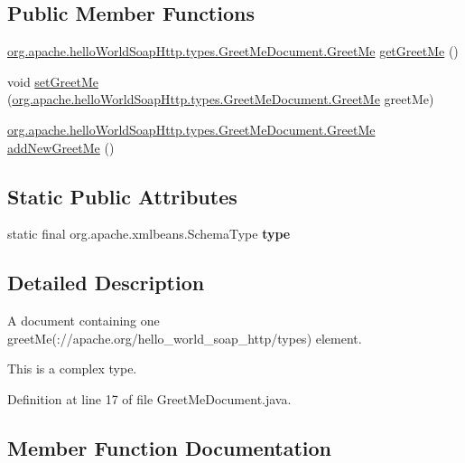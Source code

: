 \subsection*{Public Member Functions}
\begin{DoxyCompactItemize}
\item 
\hyperlink{interfaceorg_1_1apache_1_1hello_world_soap_http_1_1types_1_1_greet_me_document_1_1_greet_me}{org.\+apache.\+hello\+World\+Soap\+Http.\+types.\+Greet\+Me\+Document.\+Greet\+Me} \hyperlink{interfaceorg_1_1apache_1_1hello_world_soap_http_1_1types_1_1_greet_me_document_a13dabe72f28b15c8ddad003df9dd1369}{get\+Greet\+Me} ()
\item 
void \hyperlink{interfaceorg_1_1apache_1_1hello_world_soap_http_1_1types_1_1_greet_me_document_a3d4f4a336f799d082c23ddca3fa95a13}{set\+Greet\+Me} (\hyperlink{interfaceorg_1_1apache_1_1hello_world_soap_http_1_1types_1_1_greet_me_document_1_1_greet_me}{org.\+apache.\+hello\+World\+Soap\+Http.\+types.\+Greet\+Me\+Document.\+Greet\+Me} greet\+Me)
\item 
\hyperlink{interfaceorg_1_1apache_1_1hello_world_soap_http_1_1types_1_1_greet_me_document_1_1_greet_me}{org.\+apache.\+hello\+World\+Soap\+Http.\+types.\+Greet\+Me\+Document.\+Greet\+Me} \hyperlink{interfaceorg_1_1apache_1_1hello_world_soap_http_1_1types_1_1_greet_me_document_a3961b7576b6c83b90921ea47d9d71e4c}{add\+New\+Greet\+Me} ()
\end{DoxyCompactItemize}
\subsection*{Static Public Attributes}
\begin{DoxyCompactItemize}
\item 
static final org.\+apache.\+xmlbeans.\+Schema\+Type {\bfseries type}
\end{DoxyCompactItemize}


\subsection{Detailed Description}
A document containing one greet\+Me(\+://apache.org/hello\+\_\+world\+\_\+soap\+\_\+http/types) element.

This is a complex type. 

Definition at line 17 of file Greet\+Me\+Document.\+java.



\subsection{Member Function Documentation}
\hypertarget{interfaceorg_1_1apache_1_1hello_world_soap_http_1_1types_1_1_greet_me_document_a3961b7576b6c83b90921ea47d9d71e4c}{}
